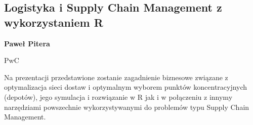 \documentclass[\main/boa.tex]{subfiles}
\begin{document}
\subsection{Logistyka i Supply Chain Management z wykorzystaniem R}

\begin{minipage}{0.915\textwidth}
	\centering
  {\bf {} Paweł Pitera}
\end{minipage}


\begin{affiliations}
\begin{minipage}{0.915\textwidth}
\centering
PwC \\[-2pt]
\end{minipage}
\end{affiliations}

\vskip 0.3cm

  Na prezentacji przedstawione zostanie zagadnienie biznesowe związane z optymalizacja sieci dostaw i optymalnym wyborem punktów koncentracyjnych (depotów), jego symulacja i rozwiązanie w R jak i w połączeniu z innymy narzędziami powszechnie wykorzystywanymi do problemów typu Supply Chain Management. 
\end{document}
